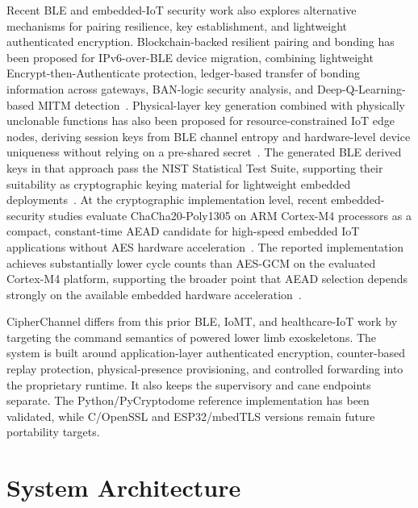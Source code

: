\documentclass[journal]{IEEEtran}
\begin{document}
Recent BLE and embedded-IoT security work also explores alternative mechanisms for pairing resilience, key establishment, and lightweight authenticated encryption.
Blockchain-backed resilient pairing and bonding has been proposed for IPv6-over-BLE device migration, combining lightweight Encrypt-then-Authenticate protection, ledger-based transfer of bonding information across gateways, BAN-logic security analysis, and Deep-Q-Learning-based MITM detection~\cite{devi2025blockchainble}.
Physical-layer key generation combined with physically unclonable functions has also been proposed for resource-constrained IoT edge nodes, deriving session keys from BLE channel entropy and hardware-level device uniqueness without relying on a pre-shared secret~\cite{hadrich2025plkgpuf}.
The generated BLE derived keys in that approach pass the NIST Statistical Test Suite, supporting their suitability as cryptographic keying material for lightweight embedded deployments~\cite{hadrich2025plkgpuf}.
At the cryptographic implementation level, recent embedded-security studies evaluate ChaCha20-Poly1305 on ARM Cortex-M4 processors as a compact, constant-time AEAD candidate for high-speed embedded IoT applications without AES hardware acceleration~\cite{desantis2017chacha20}.
The reported implementation achieves substantially lower cycle counts than AES-GCM on the evaluated Cortex-M4 platform, supporting the broader point that AEAD selection depends strongly on the available embedded hardware acceleration~\cite{desantis2017chacha20}.

CipherChannel differs from this prior BLE, IoMT, and healthcare-IoT work by targeting the command semantics of powered lower limb exoskeletons.
The system is built around application-layer authenticated encryption, counter-based replay protection, physical-presence provisioning, and controlled forwarding into the proprietary runtime. It also keeps the supervisory and cane endpoints separate. The Python/PyCryptodome reference implementation has been validated, while C/OpenSSL and ESP32/mbedTLS versions remain future portability targets.

\section{System Architecture}
\label{sec:sysarch}
\end{document}
